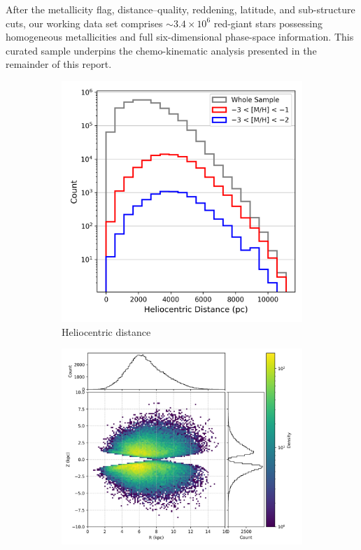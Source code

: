 \documentclass[a4paper,12pt]{article}
\begin{document}
After the metallicity flag, distance–quality, reddening, latitude, and sub-structure cuts, our working data set comprises $\sim3.4\times10^{6}$ red-giant stars possessing homogeneous metallicities and full six-dimensional phase-space information.  
This curated sample underpins the chemo-kinematic analysis presented in the remainder of this report.

\begin{figure}
  \centering
  \begin{subfigure}[b]{0.32\textwidth}
    \includegraphics[width=\textwidth]{../figures/distance_histogram.png}
    \caption{Heliocentric distance}
    \label{fig:dist_hist}
  \end{subfigure}\hfill
  \begin{subfigure}[b]{0.32\textwidth}
    \includegraphics[width=\textwidth]{../figures/ZR_distribution.png}

\end{subfigure}
\end{figure}
\end{document}
